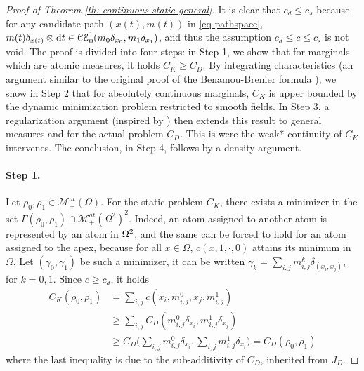 %
\begin{proof}[Proof of Theorem \ref{th: continuous static general}]
It is clear that $c_d\leq c_s$ because for any candidate path $(x(t),m(t))$ in \eqref{eq-pathspace}, $m(t)\delta_{x(t)} \otimes \mathrm{d} t \in \mathcal{CE}_0^1(m_0 \delta_{x_0}, m_1 \delta_{x_1})$, and thus the assumption $c_d \leq c \leq c_s$ is not void. The proof is divided into four steps: in Step 1, we show that for marginals which are atomic measures, it holds $C_K\geq C_D$. By integrating characteristics (an argument similar to the original proof of the Benamou-Brenier formula \cite{benamou2000computational}), we show in Step 2 that for absolutely continuous marginals, $C_K$ is upper bounded by the dynamic minimization problem restricted to smooth fields. In Step 3, a regularization argument (inspired by \cite[Theorem 8.1]{cedric2003topics}) then extends this result to general measures and for the actual problem $C_D$. This is were the weak* continuity of $C_K$ intervenes. The conclusion, in Step 4, follows by a density argument.

\paragraph{Step 1.}
Let $\rho_0, \rho_1 \in \mathcal{M}^{at}_+(\Omega)$. 
For the static problem $C_K$, there exists a minimizer in the set $\Gamma(\rho_0,\rho_1)\cap \mathcal{M}_+^{at}(\Omega^2)^2$. Indeed, an atom assigned to another atom is represented by an atom in $\Omega^2$, and the same can be forced to hold for an atom assigned to the apex, because for all $x\in \Omega$, $c(x,1,\cdot,0)$ attains its minimum in $\Omega$. Let $(\gamma_0,\gamma_1)$ be such a minimizer, it can be written $\gamma_k = \sum_{i,j} m^k_{i,j} \delta_{(x_i,x_j)}$, for $k=0,1$. Since $c\geq c_d$, it holds
\begin{align*}
C_K(\rho_0,\rho_1) 
&= \sum_{i,j} c(x_i,m^0_{i,j},x_j,m^1_{i,j})\\
&\geq \sum_{i,j} C_D ( m^0_{i,j} \delta_{x_i} , m^1_{i,j} \delta_{x_j})\\
& \geq C_D \big(\sum_{i,j} m^0_{i,j} \delta_{x_i} , \sum_{i,j} m^1_{i,j} \delta_{x_i}\big) = C_D(\rho_0,\rho_1)
\end{align*}
where the last inequality is due to the sub-additivity of $C_D$, inherited from $J_D$.


\end{proof}
